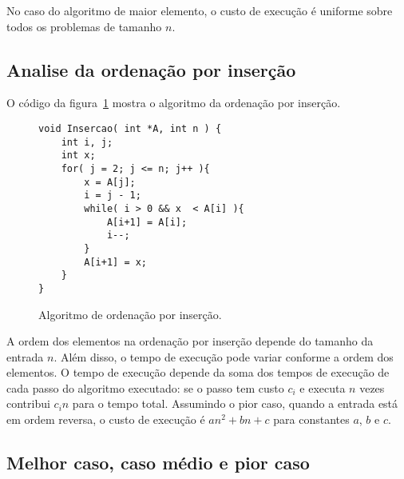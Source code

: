 No caso do algoritmo de maior elemento, o custo de execução é uniforme sobre todos os problemas 
de tamanho $n$.

\subsection{Analise da ordenação por inserção}

O código da figura~\ref{aula02:algo:insertion} mostra o algoritmo da ordenação
por inserção.
%
\begin{figure}[!htb]
\centering
\begin{framed}
\begin{lstlisting}
void Insercao( int *A, int n ) {
	int i, j;
	int x;
	for( j = 2; j <= n; j++ ){
		x = A[j];
		i = j - 1;
		while( i > 0 && x  < A[i] ){
			A[i+1] = A[i];
			i--;
		}
		A[i+1] = x;
	}
}
\end{lstlisting}
\end{framed}
\caption{Algoritmo de ordenação por inserção.}
\label{aula02:algo:insertion}
\end{figure}
%

A ordem dos elementos na ordenação por inserção depende do tamanho da entrada $n$. 
Além disso, o tempo de execução pode variar conforme a ordem dos elementos.
%
O tempo de execução depende da soma dos tempos de execução de cada passo do algoritmo
executado: se o passo tem custo $c_i$ e executa $n$ vezes contribui $c_i n$ para o tempo
total.
Assumindo o pior caso, quando a entrada está em ordem reversa, o custo de execução é 
$an^2 + bn +c$ para constantes $a$, $b$ e $c$.


\subsection{Melhor caso, caso médio e pior caso}

